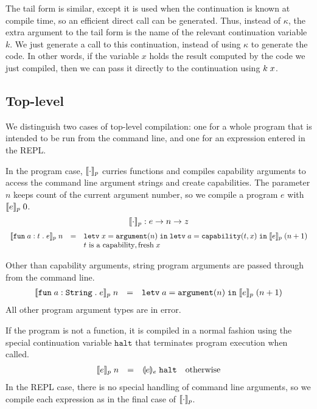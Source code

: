 \documentclass[11pt]{article}
\newcommand{\kw}[1]{\mathtt{#1}}
\begin{document}
The tail form is similar, except it is used when the continuation is known at compile time, so an efficient direct call can be generated.
Thus, instead of $\kappa$, the extra argument to the tail form is the name of the relevant continuation variable $k$.
We just generate a call to this continuation, instead of using $\kappa$ to generate the code.
In other words, if the variable $x$ holds the result computed by the code we just compiled, then we can pass it directly to the continuation using $\appc{k}{x}$.

\subsection*{Top-level}

We distinguish two cases of top-level compilation: one for a whole program that is intended to be run from the command line, and one for an expression entered in the REPL.

In the program case, $\cmpn{p}$ curries functions and compiles capability arguments to access the command line argument strings and create capabilities.
The parameter $n$ keeps count of the current argument number, so we compile a program $e$ with $\cmpin{p}{e}{0}$.
\[
    \cmpn{p} : e -> n -> z
\]
\[
\begin{array}{rcll}
\cmpin{p}{\fune{\arge{a}{t}}{e}}{n} & = &
  \letv{x}{\prmv{\kw{argument}}{n}}{\letv{a}{\prmv{\kw{capability}}{t,x}}{\cmpin{p}{e}{(n + 1)}}} \\
  & &
  \text{$t$ is a capability}, \fresh{x} \\
\end{array}
\]

Other than capability arguments, string program arguments are passed through from the command line.
\[
\begin{array}{rcll}
\cmpin{p}{\fune{\arge{a}{\kw{String}}}{e}}{n} & = &
  \letv{a}{\prmv{\kw{argument}}{n}}{\cmpin{p}{e}{(n + 1)}}
  \\
\end{array}
\]
All other program argument types are in error.

If the program is not a function, it is compiled in a normal fashion using the special continuation variable $\kw{halt}$ that terminates program execution when called.
\[
\begin{array}{rcll}
\cmpin{p}{e}{n} & = &
  \tcmpin{e}{e}{\kw{halt}} &
  \text{otherwise}
\end{array}
\]
In the REPL case, there is no special handling of command line arguments, so we compile each expression as in the final case of $\cmpn{p}$.
\end{document}
